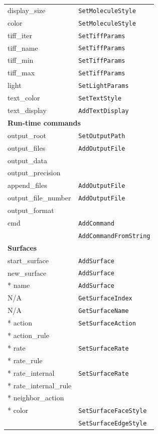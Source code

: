\documentclass {scrbook}
\newcommand {\ttt} {\texttt}
\begin{document}
\begin{longtable}[c]{ll}
display\_size & \ttt{SetMoleculeStyle}\\
color & \ttt{SetMoleculeStyle}\\
tiff\_iter & \ttt{SetTiffParams}\\
tiff\_name & \ttt{SetTiffParams}\\
tiff\_min & \ttt{SetTiffParams}\\
tiff\_max & \ttt{SetTiffParams}\\
light & \ttt{SetLightParams}\\
text\_color & \ttt{SetTextStyle}\\
text\_display & \ttt{AddTextDisplay}\\
\hline
\multicolumn{2}{l}{\hspace{0.3in}\textbf{Run-time commands}}\\
\hline
output\_root & \ttt{SetOutputPath}\\
output\_files & \ttt{AddOutputFile}\\
output\_data \\ %
output\_precision \\ %
append\_files & \ttt{AddOutputFile}\\
output\_file\_number & \ttt{AddOutputFile}\\
output\_format \\ %
cmd & \ttt{AddCommand}\\
& \ttt{AddCommandFromString}\\
\hline
\multicolumn{2}{l}{\hspace{0.3in}\textbf{Surfaces}}\\
\hline
start\_surface & \ttt{AddSurface}\\
new\_surface & \ttt{AddSurface}\\
{*} name & \ttt{AddSurface}\\
N/A & \ttt{GetSurfaceIndex}\\
N/A & \ttt{GetSurfaceName}\\
{*} action & \ttt{SetSurfaceAction}\\
{*} action\_rule \\ %
{*} rate & \ttt{SetSurfaceRate}\\
{*} rate\_rule \\ %
{*} rate\_internal & \ttt{SetSurfaceRate}\\
{*} rate\_internal\_rule \\ %
{*} neighbor\_action \\ %
{*} color & \ttt{SetSurfaceFaceStyle}\\
& \ttt{SetSurfaceEdgeStyle}\\

\end{longtable}
\end{document}
